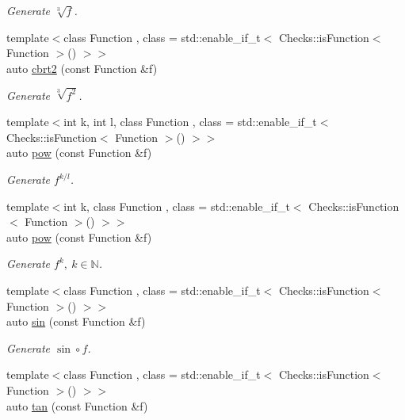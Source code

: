\begin{DoxyCompactItemize}
\begin{DoxyCompactList}\small\item\em Generate $ \sqrt[3]{f} $. \end{DoxyCompactList}\item 
{\footnotesize template$<$class Function , class  = std\-::enable\-\_\-if\-\_\-t$<$ Checks\-::is\-Function$<$ Function $>$() $>$$>$ }\\auto \hyperlink{group__CMathGroup_gafd27322fb64c6df3366f384c93819a06}{cbrt2} (const Function \&f)
\begin{DoxyCompactList}\small\item\em Generate $ \sqrt[3]{f^2}$. \end{DoxyCompactList}\item 
{\footnotesize template$<$int k, int l, class Function , class  = std\-::enable\-\_\-if\-\_\-t$<$ Checks\-::is\-Function$<$ Function $>$() $>$$>$ }\\auto \hyperlink{group__CMathGroup_gaecae6fa60bbfc0eb1867581ee4577d4e}{pow} (const Function \&f)
\begin{DoxyCompactList}\small\item\em Generate $ f^{k/l} $. \end{DoxyCompactList}\item 
{\footnotesize template$<$int k, class Function , class  = std\-::enable\-\_\-if\-\_\-t$<$ Checks\-::is\-Function$<$ Function $>$() $>$$>$ }\\auto \hyperlink{group__CMathGroup_gab52ffe2efd379aad7ea322de46103465}{pow} (const Function \&f)
\begin{DoxyCompactList}\small\item\em Generate $ f^k,\ k\in\mathbb{N}$. \end{DoxyCompactList}\item 
{\footnotesize template$<$class Function , class  = std\-::enable\-\_\-if\-\_\-t$<$ Checks\-::is\-Function$<$ Function $>$() $>$$>$ }\\auto \hyperlink{group__CMathGroup_ga663fdbe7a8977cba529c7c33981b7738}{sin} (const Function \&f)
\begin{DoxyCompactList}\small\item\em Generate $ \sin\circ f $. \end{DoxyCompactList}\item 
{\footnotesize template$<$class Function , class  = std\-::enable\-\_\-if\-\_\-t$<$ Checks\-::is\-Function$<$ Function $>$() $>$$>$ }\\auto \hyperlink{group__CMathGroup_gae03f57bd4efb4449ad1dc60cb74c742d}{tan} (const Function \&f)

\end{DoxyCompactItemize}
